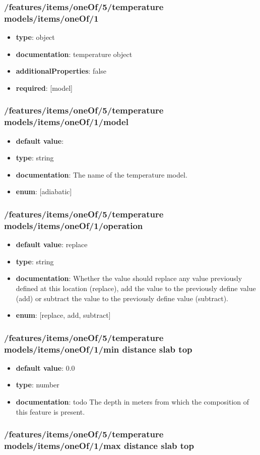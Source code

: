 \subsubsection{/features/items/oneOf/5/temperature models/items/oneOf/1}
\begin{itemize}\item {\bf type}: object
\item {\bf documentation}: temperature object
\item {\bf additionalProperties}: false
\item {\bf required}: [model]\end{itemize}
\subsubsection{/features/items/oneOf/5/temperature models/items/oneOf/1/model}
\begin{itemize}\item {\bf default value}: 
\item {\bf type}: string
\item {\bf documentation}: The name of the temperature model.
\item {\bf enum}: [adiabatic]\end{itemize}\subsubsection{/features/items/oneOf/5/temperature models/items/oneOf/1/operation}
\begin{itemize}\item {\bf default value}: replace
\item {\bf type}: string
\item {\bf documentation}: Whether the value should replace any value previously defined at this location (replace), add the value to the previously define value (add) or subtract the value to the previously define value (subtract).
\item {\bf enum}: [replace, add, subtract]\end{itemize}\subsubsection{/features/items/oneOf/5/temperature models/items/oneOf/1/min distance slab top}
\begin{itemize}\item {\bf default value}: 0.0
\item {\bf type}: number
\item {\bf documentation}: todo The depth in meters from which the composition of this feature is present.
\end{itemize}\subsubsection{/features/items/oneOf/5/temperature models/items/oneOf/1/max distance slab top}
